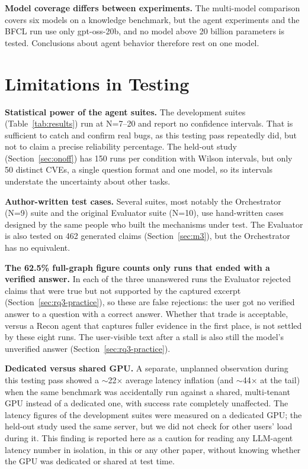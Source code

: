 \documentclass[conference]{IEEEtran}
\begin{document}
\textbf{Model coverage differs between experiments.} The multi-model
comparison covers six models on a knowledge benchmark, but the agent
experiments and the BFCL run use only gpt-oss-20b, and no model above
20 billion parameters is tested. Conclusions about agent behavior
therefore rest on one model.

\section{Limitations in Testing}
\label{sec:testing-limitations}

\textbf{Statistical power of the agent suites.} The development suites
(Table~\ref{tab:results}) run at N=7--20 and report no confidence intervals.
That is sufficient to catch and confirm real bugs, as this testing pass
repeatedly did, but not to claim a precise reliability percentage. The
held-out study (Section~\ref{sec:onoff}) has 150 runs per condition with Wilson
intervals, but only 50 distinct CVEs, a single question format and one model,
so its intervals understate the uncertainty about other tasks.

\textbf{Author-written test cases.} Several suites, most notably the
Orchestrator (N=9) suite and the original Evaluator suite (N=10), use
hand-written cases designed by the same people who built the mechanisms under
test. The Evaluator is also tested on 462 generated claims
(Section~\ref{sec:m3}), but the Orchestrator has no equivalent.

\textbf{The 62.5\% full-graph figure counts only runs that ended with a
verified answer.} In each of the three unanswered runs the Evaluator
rejected claims that were true but not supported by the captured excerpt
(Section~\ref{sec:rq3-practice}), so these are false rejections: the user
got no verified answer to a question with a correct answer. Whether that
trade is acceptable, versus a Recon agent that captures fuller evidence in
the first place, is not settled by these eight runs. The user-visible text
after a stall is also still the model's unverified answer
(Section~\ref{sec:rq3-practice}).

\textbf{Dedicated versus shared GPU.} A separate, unplanned
observation during this testing pass showed a $\sim$22$\times$ average latency
inflation (and $\sim$44$\times$ at the tail) when the same benchmark was
accidentally run against a shared, multi-tenant GPU instead of a dedicated
one, with success rate completely unaffected. The latency figures of the
development suites were measured on a dedicated GPU; the held-out study used the
same server, but we did not check for other users' load during it. This finding is reported here as a
caution for reading any LLM-agent latency number in isolation, in this or
any other paper, without knowing whether the GPU was dedicated or shared at
test time.
\end{document}
